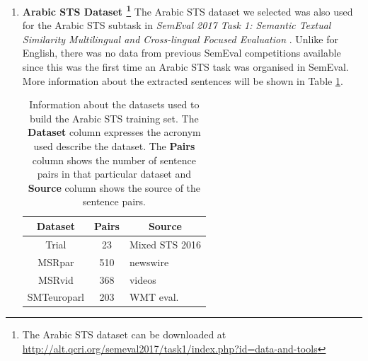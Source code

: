   
\begin{enumerate}
\item{ \textbf{Arabic STS Dataset \footnote{The Arabic STS dataset can be downloaded at \url{http://alt.qcri.org/semeval2017/task1/index.php?id=data-and-tools}}}} The Arabic STS dataset we selected was also used for the Arabic STS subtask in \textit{SemEval 2017 Task 1: Semantic Textual Similarity Multilingual and Cross-lingual Focused Evaluation} \autocite{cer-etal-2017-semeval}. Unlike for English, there was no data from previous SemEval competitions available since this was the first time an Arabic STS task was organised in SemEval. More information about the extracted sentences will be shown in Table \ref{tab:arabicdata_info}. 

\begin{table}[ht!]
	\centering
	\begin{tabular}{c|c|l}
		\hline
		\multicolumn{1}{c|}{\textbf{Dataset}} & 
		\multicolumn{1}{c|}{\textbf{Pairs}} & 
		\multicolumn{1}{c}{\textbf{Source}} \\
		\hline
		Trial & 23 & Mixed STS 2016 \\
		MSRpar  & 510 & newswire \\
		MSRvid  & 368 & videos \\
		SMTeuroparl  & 203 & WMT eval. \\
		\hline
	\end{tabular}
	\caption[Information about Arabic STS training set]{Information about the datasets used to build the Arabic STS training set. The \textbf{Dataset} column expresses the acronym used describe the dataset. The \textbf{Pairs} column shows the number of sentence pairs in that particular dataset and \textbf{Source} column shows the source of the sentence pairs. }
	\label{tab:arabicdata_info}
\end{table} 


\end{enumerate}
